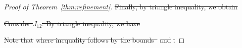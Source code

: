 \documentclass[lettersize,onecolumn,journal]{IEEEtran}
\theoremstyle{definition}
\theoremstyle{definition}
\newcommand{\offf}[1]{\left\{#1\right\}}
\def\fixme#1#2{\textbf{\color{red}[FIXME (#1): #2]}}
\providecommand{\DIFdeltex}[1]{{\protect\color{red}\sout{#1}}}                      %
\providecommand{\DIFdel}[1]{\texorpdfstring{\DIFdeltex{#1}}{}} %
\begin{document}
\begin{proof}[Proof of Theorem~\ref{thm:refinement}]

\DIFdel{Finally, by triangle inequality, we obtain
    }%


\DIFdel{Consider $J_{12}$. By triangle inequality, we have 
    }%

\DIFdel{Note that 
    }%
\DIFdel{where inequality follows by the bounds~}%
\DIFdel{and }%
\DIFdel{.
    }%


\end{proof}
\end{document}
